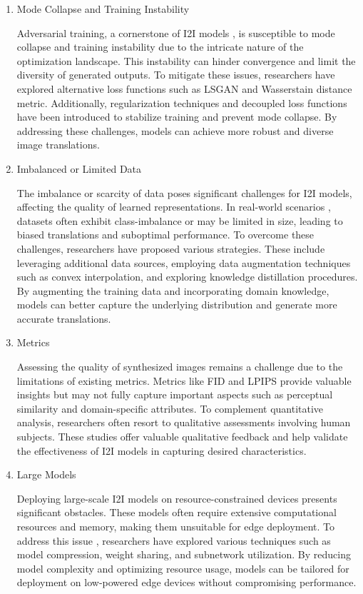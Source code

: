 \documentclass[UKenglish,12pt]{master-style}
\begin{document}
\begin{enumerate}
\item Mode Collapse and Training Instability

Adversarial training, a cornerstone of I2I models \cite{application}, is susceptible to mode collapse and training instability due to the intricate nature of the optimization landscape. This instability can hinder convergence and limit the diversity of generated outputs. To mitigate these issues, researchers have explored alternative loss functions such as LSGAN and Wasserstain distance metric. Additionally, regularization techniques and decoupled loss functions have been introduced to stabilize training and prevent mode collapse. By addressing these challenges, models can achieve more robust and diverse image translations.

\item Imbalanced or Limited Data

The imbalance or scarcity of data poses significant challenges for I2I models, affecting the quality of learned representations. In real-world scenarios \cite{application}, datasets often exhibit class-imbalance or may be limited in size, leading to biased translations and suboptimal performance. To overcome these challenges, researchers have proposed various strategies. These include leveraging additional data sources, employing data augmentation techniques such as convex interpolation, and exploring knowledge distillation procedures. By augmenting the training data and incorporating domain knowledge, models can better capture the underlying distribution and generate more accurate translations.

\item Metrics

Assessing the quality of synthesized images remains a challenge due to the limitations of existing metrics. Metrics like FID and LPIPS \cite{application} provide valuable insights but may not fully capture important aspects such as perceptual similarity and domain-specific attributes. To complement quantitative analysis, researchers often resort to qualitative assessments involving human subjects. These studies offer valuable qualitative feedback and help validate the effectiveness of I2I models in capturing desired characteristics.

\item Large Models

Deploying large-scale I2I models on resource-constrained devices presents significant obstacles. These models often require extensive computational resources and memory, making them unsuitable for edge deployment. To address this issue \cite{application}, researchers have explored various techniques such as model compression, weight sharing, and subnetwork utilization. By reducing model complexity and optimizing resource usage, models can be tailored for deployment on low-powered edge devices without compromising performance.


\end{enumerate}
\end{document}
